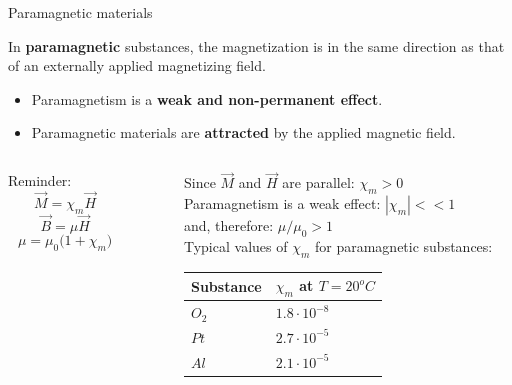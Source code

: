 %
%
%

\begin{frame}{Paramagnetic materials}

In {\bf paramagnetic} substances, the magnetization is in the same direction
as that of an externally applied magnetizing field.
\begin{itemize}
  \item Paramagnetism is a {\bf weak and non-permanent effect}.\\
  \item Paramagnetic materials are {\bf attracted} by the applied magnetic field.
\end{itemize}
\vspace{0.3cm}

\begin{columns}
  \begin{column}{0.25\textwidth}
   \begin{block}{}
     Reminder:
     \begin{equation*}
       \vec{M} = \chi_{m} \vec{H}
     \end{equation*}
     \begin{equation*}
       \vec{B} = \mu \vec{H}
     \end{equation*}
     \begin{equation*}
        \mu = \mu_0 \Big(1 + \chi_{m} \Big)
     \end{equation*}
   \end{block}
  \end{column}
  \begin{column}{0.05\textwidth}
  \end{column}
  \begin{column}{0.70\textwidth}
     Since $\vec{M}$ and $\vec{H}$ are parallel: $\chi_{m} > 0$\\
     \vspace{0.2cm}
     Paramagnetism is a weak effect: $|\chi_{m}| << 1$\\
     and, therefore: $\mu / \mu_{0} > 1$\\
     \vspace{0.2cm}
     Typical values of $\chi_m$ for paramagnetic substances:
     \begin{center}
       \begin{table}[H]
         \begin{tabular}{|l|l|}
         \hline
           Substance &  $\chi_m$ at $T=20^{o}C$ \\
         \hline
           $O_{2}$  & $1.8 \cdot 10^{-8}$ \\
           $Pt$     & $2.7 \cdot 10^{-5}$ \\
           $Al$     & $2.1 \cdot 10^{-5}$ \\
         \hline
         \end{tabular}
       \end{table}
     \end{center}
  \end{column}
\end{columns}

\end{frame}

